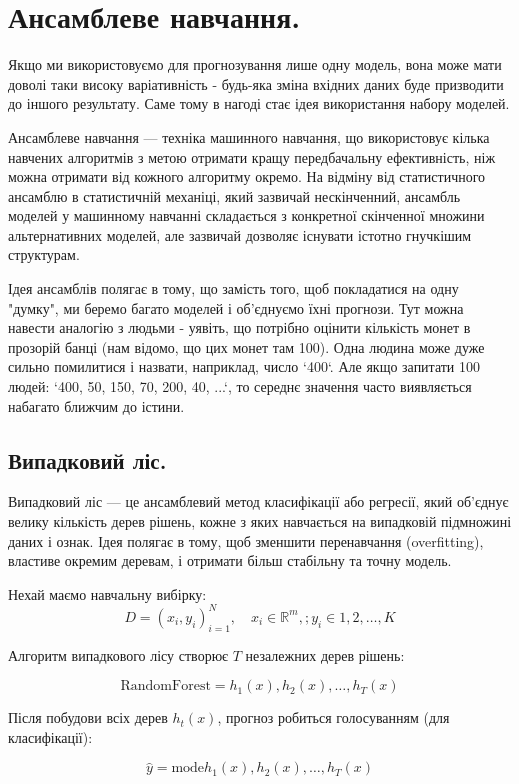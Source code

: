 \chapter{Ансамблеве навчання.}

Якщо ми використовуємо для прогнозування лише одну модель, вона може мати доволі таки високу варіативність - будь-яка зміна вхідних даних буде призводити до іншого результату. Саме тому в нагоді стає ідея використання набору моделей.

Ансамблеве навчання — техніка машинного навчання, що використовує кілька навчених алгоритмів з метою отримати кращу передбачальну ефективність, ніж можна отримати від кожного алгоритму окремо. На відміну від статистичного ансамблю в статистичній механіці, який зазвичай нескінченний, ансамбль моделей у машинному навчанні складається з конкретної скінченної множини альтернативних моделей, але зазвичай дозволяє існувати істотно гнучкішим структурам.

Ідея ансамблів полягає в тому, що замість того, щоб покладатися на одну "думку", ми беремо багато моделей і об'єднуємо їхні прогнози. Тут можна навести аналогію з людьми - уявіть, що потрібно оцінити кількість монет в прозорій банці (нам відомо, що цих монет там 100). Одна людина може дуже сильно помилитися і назвати, наприклад, число `400`. Але якщо запитати 100 людей: `400, 50, 150, 70, 200, 40, ...`, то середнє значення часто виявляється набагато ближчим до істини. 

\section{Випадковий ліс.}

Випадковий ліс — це ансамблевий метод класифікації або регресії, який об’єднує велику кількість дерев рішень, кожне з яких навчається на випадковій підмножині даних і ознак.
Ідея полягає в тому, щоб зменшити перенавчання (overfitting), властиве окремим деревам, і отримати більш стабільну та точну модель.


Нехай маємо навчальну вибірку:
$$
D = {(x_i, y_i)}_{i=1}^{N}, \quad x_i \in \mathbb{R}^m, ; y_i \in {1, 2, \dots, K}
$$

Алгоритм випадкового лісу створює $ T $ незалежних дерев рішень:

$$
\text{RandomForest} = { h_1(x), h_2(x), \dots, h_T(x) }
$$

Після побудови всіх дерев $ h_t(x) $, прогноз робиться голосуванням (для класифікації):

$$
\hat{y} = \text{mode}{ h_1(x), h_2(x), \dots, h_T(x) }
$$

